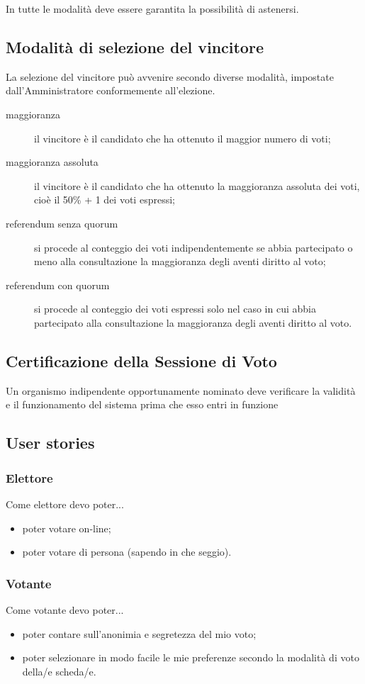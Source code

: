 \documentclass{report}
\begin{document}
In tutte le modalità deve essere garantita la possibilità di astenersi.


\subsection{Modalità di selezione del vincitore}
La selezione del vincitore può avvenire secondo diverse modalità, impostate dall'Amministratore conformemente all'elezione.
\begin{description}
	\item[maggioranza] il vincitore è il candidato che ha ottenuto il maggior numero di voti;
	\item[maggioranza assoluta] il vincitore è il candidato che ha ottenuto la maggioranza assoluta dei voti, cioè il 50\% + 1 dei voti espressi;
	\item[referendum senza quorum] si procede al conteggio dei voti indipendentemente se abbia partecipato o meno alla consultazione la maggioranza degli aventi diritto al voto; 
	\item[referendum con quorum] si procede al conteggio dei voti espressi solo nel caso in cui abbia partecipato alla consultazione la maggioranza degli aventi diritto al voto.
\end{description}


\subsection{Certificazione della Sessione di Voto}
Un organismo indipendente opportunamente nominato deve verificare la validità e il funzionamento del sistema prima che esso entri in funzione


\subsection{User stories}

\subsubsection{Elettore}
Come elettore devo poter...
\begin{itemize}
	\item poter votare on-line;
	\item poter votare di persona (sapendo in che seggio).
\end{itemize}

\subsubsection{Votante}
Come votante devo poter...
\begin{itemize}
	\item poter contare sull'anonimia e segretezza del mio voto;
	\item poter selezionare in modo facile le mie preferenze secondo la modalità di voto della/e scheda/e.
\end{itemize}
\end{document}
